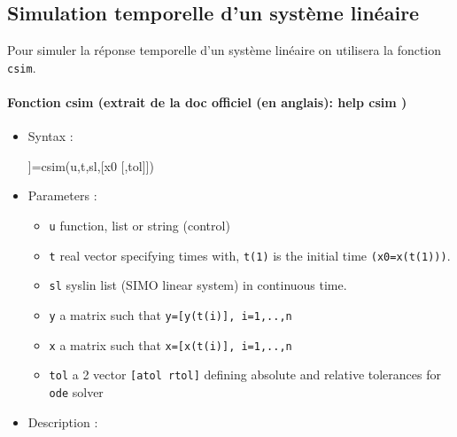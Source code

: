 \subsection{Simulation temporelle d'un système linéaire}
Pour simuler la réponse temporelle d'un système linéaire on utilisera la 
fonction \verb?csim?.
\begin{doc}
\paragraph{Fonction csim (extrait de la doc officiel (en anglais): help csim )}
\begin{itemize}
    \item Syntax :
    \begin{Scilabcode}
[y [,x]]=csim(u,t,sl,[x0 [,tol]])
    \end{Scilabcode}
    \item Parameters :
    \begin{itemize}
        \item \verb?u?  function, list or string (control)
        \item \verb?t?  real vector specifying times with, \verb?t(1)? is the 
              initial time \verb?(x0=x(t(1)))?.
        \item \verb?sl? syslin list (SIMO linear system) in continuous time.
        \item \verb?y?  a matrix such that \verb?y=[y(t(i)], i=1,..,n?
        \item \verb?x?  a matrix such that \verb?x=[x(t(i)], i=1,..,n?
        \item \verb?tol? a 2 vector \verb?[atol rtol]? defining absolute and 
              relative tolerances for \verb?ode? solver
    \end{itemize}
    \item Description :
    \begin{itemize} 

\end{itemize}
\end{itemize}
\end{doc}
